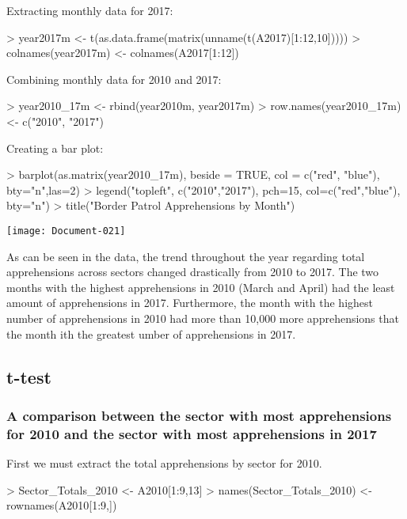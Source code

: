 \documentclass[letterpaper]{article}
\begin{document}
Extracting monthly data for 2017:
\begin{Schunk}
\begin{Sinput}
> year2017m <- t(as.data.frame(matrix(unname(t(A2017)[1:12,10]))))
> colnames(year2017m) <- colnames(A2017[1:12])
\end{Sinput}
\end{Schunk}

Combining monthly data for 2010 and 2017:
\begin{Schunk}
\begin{Sinput}
> year2010_17m <- rbind(year2010m, year2017m)
> row.names(year2010_17m) <- c("2010", "2017")
\end{Sinput}
\end{Schunk}

Creating a bar plot:
\begin{Schunk}
\begin{Sinput}
> barplot(as.matrix(year2010_17m), beside = TRUE, col = c("red", "blue"), bty="n",las=2)
> legend("topleft", c("2010","2017"), pch=15,  col=c("red","blue"),  bty="n")
> title("Border Patrol Apprehensions by Month")
\end{Sinput}
\end{Schunk}
\texttt{[image: Document-021]}

As can be seen in the data, the trend throughout the year regarding total apprehensions across sectors changed drastically from 2010 to 2017. The two months with the highest apprehensions in 2010 (March and April) had the least amount of apprehensions in 2017. Furthermore, the month with the highest number of apprehensions in 2010 had more than 10,000 more apprehensions that the month ith the greatest umber of apprehensions in 2017.

\subsection{t-test}

\subsubsection{A comparison between the sector with most apprehensions for 2010 and the sector with most apprehensions in 2017}

First we must extract the total apprehensions by sector for 2010. 
\begin{Schunk}
\begin{Sinput}
> Sector_Totals_2010 <- A2010[1:9,13]
> names(Sector_Totals_2010) <- rownames(A2010[1:9,])
\end{Sinput}
\end{Schunk}
\end{document}
